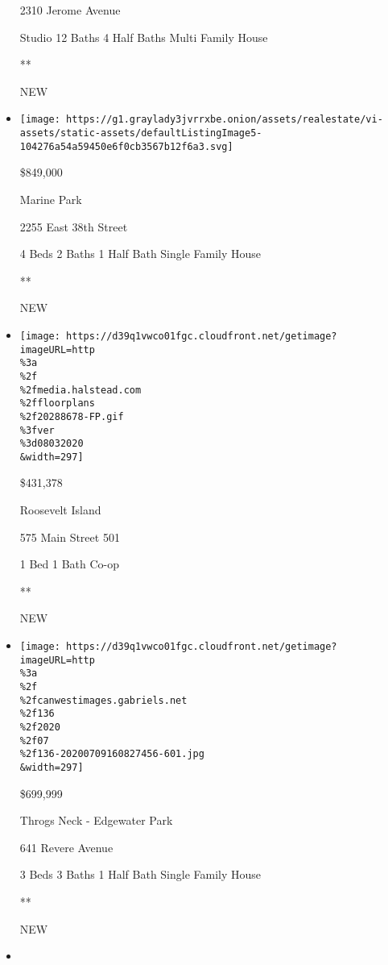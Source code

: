 \begin{itemize}
  2310 Jerome Avenue

  Studio \textbar{} 12 Baths \textbar{} 4 Half Baths \textbar{} Multi
  Family House

  **

  NEW
\item
  \href{/real-estate/usa/ny/brooklyn/marine-park/homes-for-sale/2255-east-38th-street/14888-5537978?}{}

  \texttt{[image: https://g1.graylady3jvrrxbe.onion/assets/realestate/vi-assets/static-assets/defaultListingImage5-104276a54a59450e6f0cb3567b12f6a3.svg]}

  \$849,000

  Marine Park

  2255 East 38th Street

  4 Beds \textbar{} 2 Baths \textbar{} 1 Half Bath \textbar{} Single
  Family House

  **

  NEW
\item
  \href{/real-estate/usa/ny/new-york/roosevelt-island/homes-for-sale/575-main-street-501/185-20288678?}{}

  \texttt{[image: https://d39q1vwco01fgc.cloudfront.net/getimage?imageURL=http\\\%3a\\\%2f\\\%2fmedia.halstead.com\\\%2ffloorplans\\\%2f20288678-FP.gif\\\%3fver\\\%3d08032020\\\&width=297]}

  \$431,378

  Roosevelt Island

  575 Main Street 501

  1 Bed \textbar{} 1 Bath \textbar{} Co-op

  **

  NEW
\item
  \href{/real-estate/usa/ny/bronx/throgs-neck---edgewater-park/homes-for-sale/641-revere-avenue/11237-72170695289D4?}{}

  \texttt{[image: https://d39q1vwco01fgc.cloudfront.net/getimage?imageURL=http\\\%3a\\\%2f\\\%2fcanwestimages.gabriels.net\\\%2f136\\\%2f2020\\\%2f07\\\%2f136-20200709160827456-601.jpg\\\&width=297]}

  \$699,999

  Throgs Neck - Edgewater Park

  641 Revere Avenue

  3 Beds \textbar{} 3 Baths \textbar{} 1 Half Bath \textbar{} Single
  Family House

  **

  NEW
\item
  \href{/real-estate/usa/ny/new-york/hells-kitchen/homes-for-sale/450-west-55th-street/12436-OLRS-1891536?}{}


\end{itemize}
